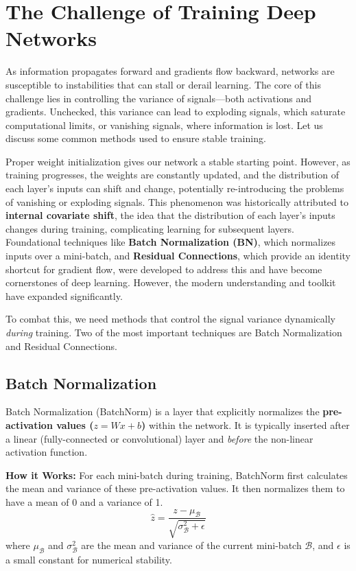\documentclass{article}
\begin{document}
\newpage

\section{The Challenge of Training Deep Networks}
As information propagates forward and gradients flow backward, networks are susceptible to instabilities that can stall or derail learning. The core of this challenge lies in controlling the variance of signals---both activations and gradients. Unchecked, this variance can lead to exploding signals, which saturate computational limits, or vanishing signals, where information is lost. Let us discuss some common  methods used to ensure stable training.

Proper weight initialization gives our network a stable starting point. However, as training progresses, the weights are constantly updated, and the distribution of each layer's inputs can shift and change, potentially re-introducing the problems of vanishing or exploding signals. 
This phenomenon was historically attributed to \textbf{internal covariate shift}, the idea that the distribution of each layer's inputs changes during training, complicating learning for subsequent layers. Foundational techniques like \textbf{Batch Normalization (BN)}, which normalizes inputs over a mini-batch, and \textbf{Residual Connections}, which provide an identity shortcut for gradient flow, were developed to address this and have become cornerstones of deep learning. However, the modern understanding and toolkit have expanded significantly.

To combat this, we need methods that control the signal variance dynamically \textit{during} training. Two of the most important techniques are Batch Normalization and Residual Connections.

\subsection{Batch Normalization}

Batch Normalization (BatchNorm) is a layer that explicitly normalizes the \textbf{pre-activation values ($z = Wx+b$)} within the network. It is typically inserted after a linear (fully-connected or convolutional) layer and \textit{before} the non-linear activation function.

\textbf{How it Works:}
For each mini-batch during training, BatchNorm first calculates the mean and variance of these pre-activation values. It then normalizes them to have a mean of 0 and a variance of 1.
\begin{equation}
    \hat{z} = \frac{z - \mu_{\mathcal{B}}}{\sqrt{\sigma^2_{\mathcal{B}} + \epsilon}}
\end{equation}
where $\mu_{\mathcal{B}}$ and $\sigma^2_{\mathcal{B}}$ are the mean and variance of the current mini-batch $\mathcal{B}$, and $\epsilon$ is a small constant for numerical stability.
\end{document}
